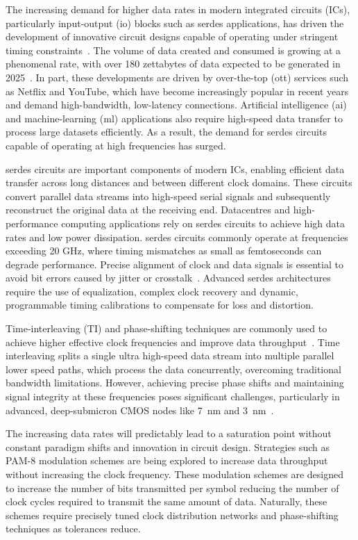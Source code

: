 The increasing demand for higher data rates in modern integrated circuits (ICs), particularly input-output (\gls{io}) blocks such as \gls{serdes} applications, has driven the development of innovative circuit designs capable of operating under stringent timing constraints~\cite{horowitz2005scaling,seok2010progress}. The volume of data created and consumed is growing at a phenomenal rate, with over 180 zettabytes of data expected to be generated in 2025~\cite{consultancy2024data}. In part, these developments are driven by over-the-top (\gls{ott}) services such as Netflix and YouTube, which have become increasingly popular in recent years and demand high-bandwidth, low-latency connections. Artificial intelligence (\gls{ai}) and machine-learning (\gls{ml}) applications also require high-speed data transfer to process large datasets efficiently. As a result, the demand for \gls{serdes} circuits capable of operating at high frequencies has surged.

\gls{serdes} circuits are important components of modern ICs, enabling efficient data transfer across long distances and between different clock domains. These circuits convert parallel data streams into high-speed serial signals and subsequently reconstruct the original data at the receiving end. Datacentres and high-performance computing applications rely on \gls{serdes} circuits to achieve high data rates and low power dissipation. \gls{serdes} circuits commonly operate at frequencies exceeding 20 GHz, where timing mismatches as small as femtoseconds can degrade performance. Precise alignment of clock and data signals is essential to avoid bit errors caused by jitter or crosstalk~\cite{lee2011self,nakamura2022high}. Advanced \gls{serdes} architectures require the use of equalization, complex clock recovery and dynamic, programmable timing calibrations to compensate for loss and distortion.

Time-interleaving (TI) and phase-shifting techniques are commonly used to achieve higher effective clock frequencies and improve data throughput~\cite{Razavi2009PLL}. Time interleaving splits a single ultra high-speed data stream into multiple parallel lower speed paths, which process the data concurrently, overcoming traditional bandwidth limitations. However, achieving precise phase shifts and maintaining signal integrity at these frequencies poses significant challenges, particularly in advanced, deep-submicron CMOS nodes like 7~nm and 3~nm~\cite{loke2019nanoscale,caignet2001challenge}.

The increasing data rates will predictably lead to a saturation point without constant paradigm shifts and innovation in circuit design. Strategies such as PAM-8 modulation schemes are being explored to increase data throughput without increasing the clock frequency. These modulation schemes are designed to increase the number of bits transmitted per symbol reducing the number of clock cycles required to transmit the same amount of data. Naturally, these schemes require precisely tuned clock distribution networks and phase-shifting techniques as tolerances reduce.

